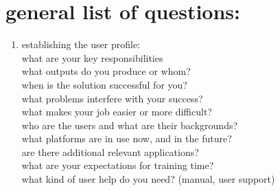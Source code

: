 \documentclass[letterpaper]{article}
\begin{document}
\section{general list of questions:}
\begin{enumerate}
 \item establishing the user profile:\\
       what are your key responsibilities\\
       what outputs do you produce or whom?\\
       when is the solution successful for you?\\
       what problems interfere with your success?\\
       what makes your job easier or more difficult?\\
       who are the users and what are their backgrounds?\\
       what platforms are in use now, and in the future?\\
       are there additional relevant applications?\\
       what are your expectations for training time?\\
       what kind of user help do you need? (manual, user support)
       

\end{enumerate}
\end{document}
